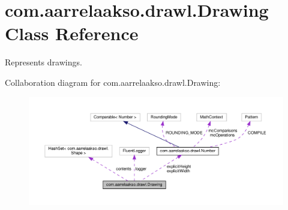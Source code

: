 \hypertarget{classcom_1_1aarrelaakso_1_1drawl_1_1_drawing}{}\section{com.\+aarrelaakso.\+drawl.\+Drawing Class Reference}
\label{classcom_1_1aarrelaakso_1_1drawl_1_1_drawing}


Represents drawings.  




Collaboration diagram for com.\+aarrelaakso.\+drawl.\+Drawing\+:\nopagebreak
\begin{figure}[H]
\begin{center}
\leavevmode
\includegraphics[width=350pt]{dd/db2/classcom_1_1aarrelaakso_1_1drawl_1_1_drawing__coll__graph}
\end{center}
\end{figure}

